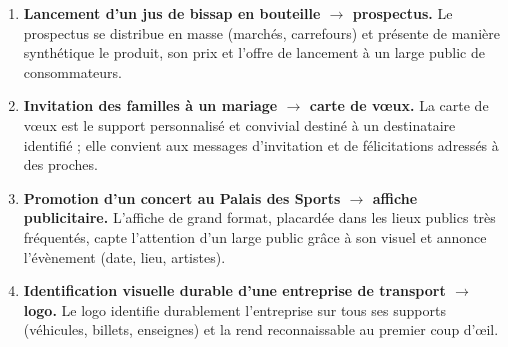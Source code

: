 \documentclass[11pt]{article}
\begin{document}
\begin{corrige}
\begin{enumerate}
\item \textbf{Lancement d'un jus de bissap en bouteille $\rightarrow$ prospectus.} Le prospectus se distribue en masse (marchés, carrefours) et présente de manière synthétique le produit, son prix et l'offre de lancement à un large public de consommateurs.
\item \textbf{Invitation des familles à un mariage $\rightarrow$ carte de vœux.} La carte de vœux est le support personnalisé et convivial destiné à un destinataire identifié ; elle convient aux messages d'invitation et de félicitations adressés à des proches.
\item \textbf{Promotion d'un concert au Palais des Sports $\rightarrow$ affiche publicitaire.} L'affiche de grand format, placardée dans les lieux publics très fréquentés, capte l'attention d'un large public grâce à son visuel et annonce l'évènement (date, lieu, artistes).
\item \textbf{Identification visuelle durable d'une entreprise de transport $\rightarrow$ logo.} Le logo identifie durablement l'entreprise sur tous ses supports (véhicules, billets, enseignes) et la rend reconnaissable au premier coup d'œil.
\end{enumerate}
\end{corrige}
\end{document}
